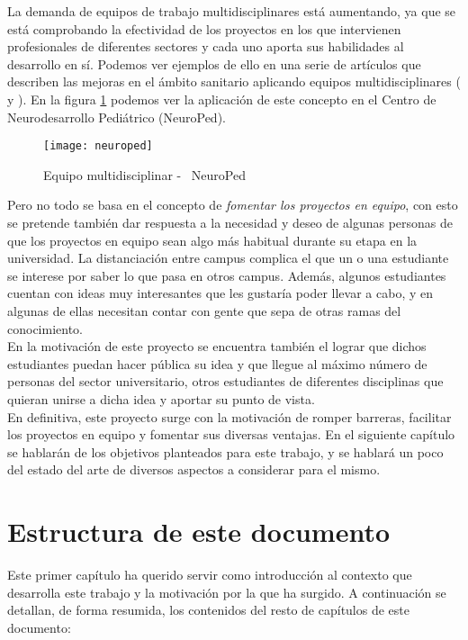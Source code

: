 La demanda de equipos de trabajo multidisciplinares está aumentando, ya que se está comprobando la efectividad de los proyectos en los que intervienen profesionales de diferentes sectores y cada uno aporta sus habilidades al desarrollo en sí. Podemos ver ejemplos de ello en una serie de artículos que describen las mejoras en el ámbito sanitario aplicando equipos multidisciplinares (\cite{health1} y \cite{health2}). En la figura \ref{neuropedimagen} podemos ver la aplicación de este concepto en el Centro de Neurodesarrollo Pediátrico (NeuroPed).\\

\begin{figure}
    \centering
    \texttt{[image: neuroped]}
    \caption{Equipo multidisciplinar - \textcopyright\ NeuroPed \cite{neuroped}}
    \label{neuropedimagen}
\end{figure}

Pero no todo se basa en el concepto de \textit{fomentar los proyectos en equipo}, con esto se pretende también dar respuesta a la necesidad y deseo de algunas personas de que los proyectos en equipo sean algo más habitual durante su etapa en la universidad. La distanciación entre campus complica el que un o una estudiante se interese por saber lo que pasa en otros campus. Además, algunos estudiantes cuentan con ideas muy interesantes que les gustaría poder llevar a cabo, y en algunas de ellas necesitan contar con gente que sepa de otras ramas del conocimiento.\\

En la motivación de este proyecto se encuentra también el lograr que dichos estudiantes puedan hacer pública su idea y que llegue al máximo número de personas del sector universitario, otros estudiantes de diferentes disciplinas que quieran unirse a dicha idea y aportar su punto de vista.\\

En definitiva, este proyecto surge con la motivación de romper barreras, facilitar los proyectos en equipo y fomentar sus diversas ventajas. En el siguiente capítulo se hablarán de los objetivos planteados para este trabajo, y se hablará un poco del estado del arte de diversos aspectos a considerar para el mismo.

\section{Estructura de este documento}
Este primer capítulo ha querido servir como introducción al contexto que desarrolla este trabajo y la motivación por la que ha surgido. A continuación se detallan, de forma resumida, los contenidos del resto de capítulos de este documento:

